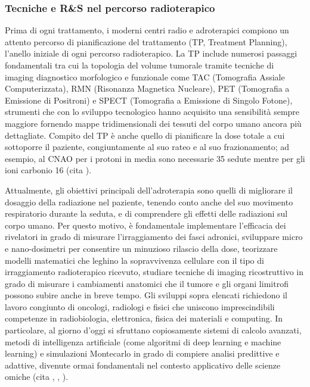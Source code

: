 \documentclass[12pt,a4paper,twoside]{report}
\begin{document}
	\subsubsection{Tecniche e R\&S nel percorso radioterapico}
	Prima di ogni trattamento, i moderni centri radio e adroterapici compiono un attento percorso di pianificazione del trattamento (TP, Treatment Planning), l'anello iniziale di ogni percorso radioterapico. La TP  include numerosi passaggi fondamentali tra cui la topologia del volume tumorale tramite tecniche di imaging diagnostico morfologico e funzionale come TAC (Tomografia Assiale Computerizzata), RMN (Risonanza Magnetica Nucleare), PET (Tomografia a Emissione di Positroni) e SPECT (Tomografia a Emissione di Singolo Fotone), strumenti che con lo sviluppo tecnologico hanno acquisito una sensibilità sempre maggiore fornendo mappe tridimensionali dei tessuti del corpo umano ancora più dettagliate. Compito del TP è anche quello di pianificare la dose totale a cui sottoporre il paziente, congiuntamente al suo rateo e al suo frazionamento; ad esempio, al CNAO per i protoni in media sono necessarie 35 sedute mentre per gli ioni carbonio 16 (cita
	).
	
	Attualmente, gli obiettivi principali dell'adroterapia sono quelli di migliorare il dosaggio della radiazione nel paziente, tenendo conto anche del suo movimento respiratorio durante la seduta, e di comprendere gli effetti delle radiazioni sul corpo umano. Per questo motivo, è fondamentale implementare l'efficacia dei rivelatori in grado di misurare l'irraggiamento dei fasci adronici, sviluppare micro e nano-dosimetri per consentire un minuzioso rilascio della dose, teorizzare modelli matematici che leghino la sopravvivenza cellulare con il tipo di irraggiamento radioterapico ricevuto, studiare tecniche di imaging ricostruttivo in grado di misurare i cambiamenti anatomici che il tumore e gli organi limitrofi possono subire anche in breve tempo. Gli sviluppi sopra elencati richiedono il lavoro congiunto di oncologi, radiologi e fisici che uniscono imprescindibili competenze in radiobiologia, elettronica, fisica dei materiali e computing. In particolare, al giorno d'oggi si sfruttano copiosamente sistemi di calcolo avanzati, metodi di intelligenza artificiale (come algoritmi di deep learning e machine learning) e simulazioni Montecarlo in grado di compiere analisi predittive e adattive, divenute ormai fondamentali nel contesto applicativo delle scienze omiche (cita
	,
	,
	).
	
\end{document}
